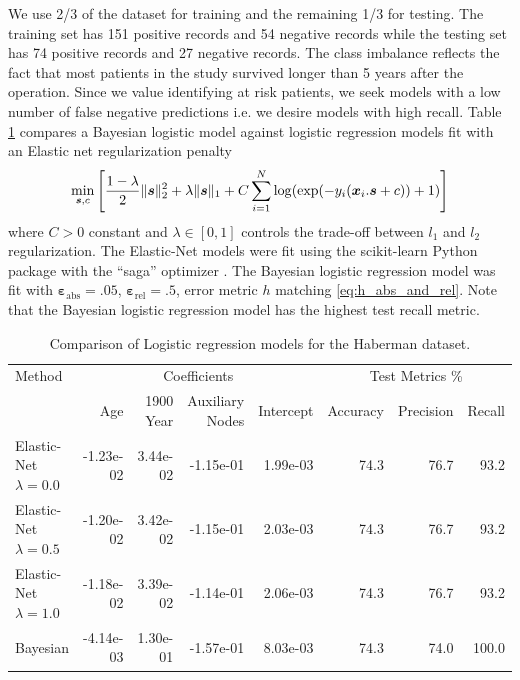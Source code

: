 \documentclass{article}[12pt]
\newcommand{\bvarepsabs}{\boldsymbol{\varepsilon}_\text{abs}}
\newcommand{\bvarepsrel}{\boldsymbol{\varepsilon}_\text{rel}}
\begin{document}
We use 2/3 of the dataset for training and the remaining 1/3 for testing. The training set has 151 positive records and 54 negative records while the testing set has 74 positive records and 27 negative records. The class imbalance reflects the fact that most patients in the study survived longer than 5 years after the operation. Since we value identifying at risk patients, we seek models with a low number of false negative predictions i.e. we desire models with high recall. Table \ref{tab:lr_models} compares a Bayesian logistic model against logistic regression models fit with an Elastic net regularization penalty
$$\min_{\boldsymbol{s},c} \left[\frac{1-\lambda}{2} \lVert \boldsymbol{s} \rVert_2^2 + \lambda \lVert \boldsymbol{s} \rVert_1+C\sum_{i=1}^N\log(\exp(-y_i(\boldsymbol{x}_i.\boldsymbol{s}+c))+1)\right]$$
where $C>0$ constant and $\lambda \in [0,1]$ controls the trade-off between $l_1$ and $l_2$ regularization. The Elastic-Net models were fit using the scikit-learn Python package with the ``saga'' optimizer \cite{scikit-learn}. The Bayesian logistic regression model was fit with $\bvarepsabs=.05$, $\bvarepsrel=.5$, error metric $h$ matching \eqref{eq:h_abs_and_rel}. Note that the Bayesian logistic regression model has the highest test recall metric.  

\begin{table}[H]
    \centering
    \begin{tabular}{l|rrrr|rrr}
        Method &\multicolumn{4}{|c|}{Coefficients} &\multicolumn{3}{c}{Test Metrics \%}\\
        {} &       Age &  1900 Year &  Auxiliary Nodes &  Intercept &  Accuracy &  Precision &   Recall \\
        \midrule
        Elastic-Net $\lambda=0.0$ & -1.23e-02 &   3.44e-02 &       -1.15e-01 &   1.99e-03 &     74.3 &      76.7 &   93.2 \\
        Elastic-Net $\lambda=0.5$ & -1.20e-02 &   3.42e-02 &       -1.15e-01 &   2.03e-03 &     74.3 &      76.7 &   93.2 \\
        Elastic-Net $\lambda=1.0$ & -1.18e-02 &   3.39e-02 &       -1.14e-01 &   2.06e-03 &     74.3 &      76.7 &   93.2 \\
        Bayesian                & -4.14e-03 &   1.30e-01 &       -1.57e-01 &   8.03e-03 &     74.3 &      74.0 &  100.0 \\
        \bottomrule
    \end{tabular}
    \caption{Comparison of Logistic regression models for the Haberman dataset.}
    \label{tab:lr_models}
\end{table}
\end{document}
